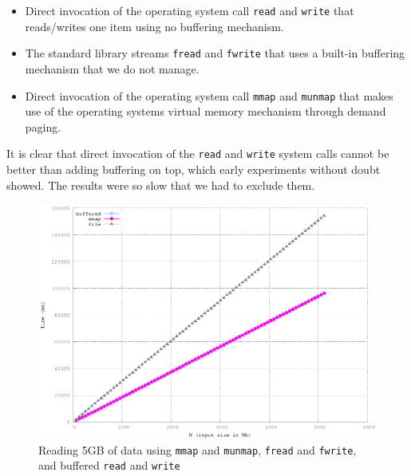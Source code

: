 \documentclass[twoside,11pt,openright]{report}
\begin{document}
\begin{itemize}
	\item Direct invocation of the operating system call \texttt{read} and \texttt{write} that reads/writes one item using no buffering mechanism.
	\item The standard library streams \texttt{fread} and \texttt{fwrite} that uses a built-in buffering mechanism that we do not manage.
	\item Direct invocation of the operating system call \texttt{mmap} and \texttt{munmap} that makes use of the operating systems virtual memory mechanism through demand paging.
\end{itemize}

It is clear that direct invocation of the \texttt{read} and \texttt{write} system calls cannot be better than adding buffering on top, which early experiments without doubt showed. The results were so slow that we had to exclude them.

\begin{figure}
  \centering
  \includegraphics[width=\linewidth]{../src/experiments/stream_input_speed_experiment_results/2016-04-23.14_45_41/timems}
  \caption{Reading 5GB of data using \texttt{mmap} and \texttt{munmap}, \texttt{fread} and \texttt{fwrite}, and buffered \texttt{read} and \texttt{write}}
  \label{fig:stream_input_speed}
\end{figure}
\end{document}
